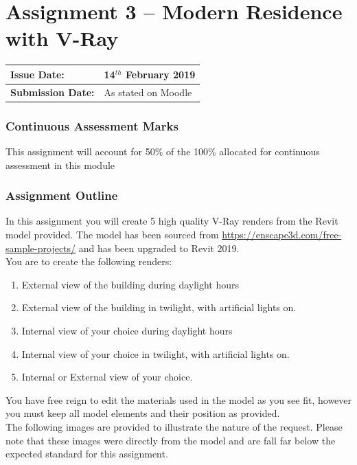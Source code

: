 
	
\part*{Assignment 3 – Modern Residence with V-Ray }

\begin{tabularx}{\textwidth}{ |X|X| }
	\hline
	\textbf{Issue Date:} & 14$^{th}$ February 2019 \\
	\hline 
	\textbf{Submission Date:}  & As stated on Moodle  \\
	\hline
\end{tabularx}


\section*{Continuous Assessment Marks}
This assignment will account for 50\% of the 100\% allocated for continuous assessment in this module

\section*{Assignment Outline}
In this assignment you will create 5 high quality V-Ray renders from the Revit model provided.  The model has been sourced from  \href{https://enscape3d.com/free-sample-projects/}{https://enscape3d.com/free-sample-projects/} and has been upgraded to Revit 2019.\\

You are to create the following renders:

\begin{enumerate}
	\item External view of the building during daylight hours
	\item External view of the building in twilight, with artificial lights on.
	\item Internal view of your choice during daylight hours
	\item Internal view of your choice in twilight, with artificial lights on.
	\item Internal or External view of your choice.
\end{enumerate}

You have free reign to edit the materials used in the model as you see fit, however you must keep all model elements and their position as provided.\\

The following images are provided to illustrate the nature of the request.  Please note that these images were directly from the model and are fall far below the expected standard for this assignment. 


